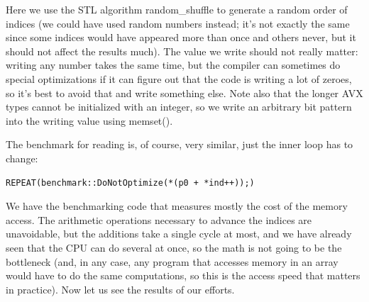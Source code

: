 Here we use the STL algorithm random\_shuffle to generate a random order of indices (we could have used random numbers instead; it's not exactly the same since some indices would have appeared more than once and others never, but it should not affect the results much). The value we write should not really matter: writing any number takes the same time, but the compiler can sometimes do special optimizations if it can figure out that the code is writing a lot of zeroes, so it's best to avoid that and write something else. Note also that the longer AVX types cannot be initialized with an integer, so we write an arbitrary bit pattern into the writing value using memset().

The benchmark for reading is, of course, very similar, just the inner loop has to change:

\begin{lstlisting}[style=styleCXX]
REPEAT(benchmark::DoNotOptimize(*(p0 + *ind++));)
\end{lstlisting}

We have the benchmarking code that measures mostly the cost of the memory access. The arithmetic operations necessary to advance the indices are unavoidable, but the additions take a single cycle at most, and we have already seen that the CPU can do several at once, so the math is not going to be the bottleneck (and, in any case, any program that accesses memory in an array would have to do the same computations, so this is the access speed that matters in practice). Now let us see the results of our efforts.




























